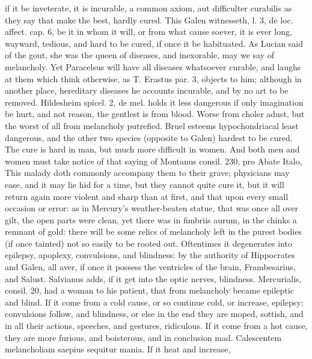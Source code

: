 if it be inveterate, it is incurable, a common axiom, aut
difficulter curabilis as they say that make the best, hardly cured.
This Galen witnesseth, l. 3, de loc. affect. cap. 6, be it in
whom it will, or from what cause soever, it is ever long, wayward,
tedious, and hard to be cured, if once it be habituated. As Lucian said
of the gout, she was the queen of diseases, and inexorable, may
we say of melancholy. Yet Paracelsus will have all diseases whatsoever
curable, and laughs at them which think otherwise, as T. Erastus par.
3, objects to him; although in another place, hereditary diseases he
accounts incurable, and by no art to be removed. Hildesheim
spicel. 2, de mel. holds it less dangerous if only imagination be
hurt, and not reason, the gentlest is from blood. Worse from
choler adust, but the worst of all from melancholy putrefied.
Bruel esteems hypochondriacal least dangerous, and the other two
species (opposite to Galen) hardest to be cured. The cure is hard
in man, but much more difficult in women. And both men and women must
take notice of that saying of Montanus consil. 230, pro Abate Italo,
This malady doth commonly accompany them to their grave;
physicians may ease, and it may lie hid for a time, but they cannot
quite cure it, but it will return again more violent and sharp than at
first, and that upon every small occasion or error: as in Mercury's
weather-beaten statue, that was once all over gilt, the open parts were
clean, yet there was in fimbriis aurum, in the chinks a remnant of
gold: there will be some relics of melancholy left in the purest bodies
(if once tainted) not so easily to be rooted out.  Oftentimes it
degenerates into epilepsy, apoplexy, convulsions, and blindness: by the
authority of Hippocrates and Galen, all aver, if once it possess
the ventricles of the brain, Frambesarius, and Salust. Salvianus adds,
if it get into the optic nerves, blindness. Mercurialis, consil. 20,
had a woman to his patient, that from melancholy became epileptic and
blind. If it come from a cold cause, or so continue cold, or
increase, epilepsy; convulsions follow, and blindness, or else in the
end they are moped, sottish, and in all their actions, speeches, and
gestures, ridiculous. If it come from a hot cause, they are more
furious, and boisterous, and in conclusion mad. Calescentem
melancholiam saepius sequitur mania. If it heat and increase,
